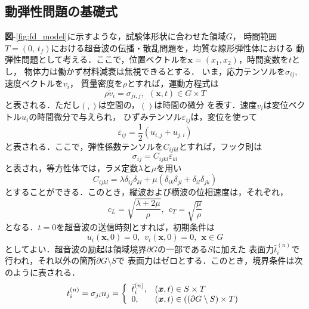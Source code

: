 \subsection{動弾性問題の基礎式}
{\bf 図}-\ref{fig:fd_model}に示すような，試験体形状に合わせた領域$G$，
時間範囲$T=(0,\, t_f)$における超音波の伝播・散乱問題を，均質な線形弾性体における
動弾性問題として考える．ここで，位置ベクトルを$\boldsymbol{x}=(x_1,x_2)$，時間変数を$t$とし，
物体力は働かず材料減衰は無視できるとする．
いま，応力テンソルを$\sigma_{ij}$, 速度ベクトルを$v_i$，
質量密度を$\rho$とすれば，運動方程式は
\begin{equation}
	\rho \dot{v}_i=\sigma_{ji,j}, \ \ (\boldsymbol{x},t)\in G\times T
	\label{eqn:}
\end{equation}
と表される．ただし$(,)$は空間の，$\dot{()}$は時間の微分
を表す．速度$v_i$は変位ベクトル$u_i$の時間微分で与えられ，
ひずみテンソル$\varepsilon_{ij}$は，変位を使って
\begin{equation}
	\varepsilon_{ij}=\frac{1}{2}(u_{i,j}+u_{j,i})
	\label{eqn:FWD}
\end{equation}
と表される．ここで，弾性係数テンソルを$C_{ijkl}$とすれば，フック則は
\begin{equation}
	\sigma_{ij}=C_{ijkl}\varepsilon_{kl}
	\label{eqn:}
\end{equation}
と表され，等方性体では，ラメ定数$\lambda$と$\mu$を用い
\begin{equation}
	C_{ijkl}=\lambda \delta_{ij}\delta_{kl} +
	\mu (
	\delta_{ik}\delta_{jl}
	+
	\delta_{il}\delta_{jk} 
	)
	\label{eqn:Cijkl_iso}
\end{equation}
とすることができる．このとき，縦波および横波の位相速度は，それぞれ，
\begin{equation}
	c_{L}=\sqrt{\frac{\lambda + 2\mu}{\rho}}
	, \ \ 
	c_{T}=\sqrt{\frac{\mu}{\rho}}
	\label{eqn:}
\end{equation}
となる．$t=0$を超音波の送信時刻とすれば，初期条件は
\begin{equation}
	u_i(\boldsymbol{x},0)=0, 
\ \ v_i(\boldsymbol{x},0)=0, 
\ \ \boldsymbol{x} \in G
	\label{eqn:IC}
\end{equation}
としてよい．超音波の励起は領域境界$\partial G$の一部である$S$に加えた
表面力$\bar{t}_i^{(n)}$で行われ，それ以外の箇所$\partial G\setminus S$で
表面力はゼロとする．このとき，境界条件は次のように表される．
\begin{equation}
	t_i^{(n)} = \sigma_{ji}n_j=
	\left\{
		\begin{array}{ll}	
			\bar{t}^{(n)}_i, & (\boldsymbol{x},t)\in S\times T \\
			0,  & (\boldsymbol{x},t)\in \left( (\partial G \setminus S)\times T\right) 
		\end{array}
	\right.
	\label{eqn:BC}
\end{equation}
